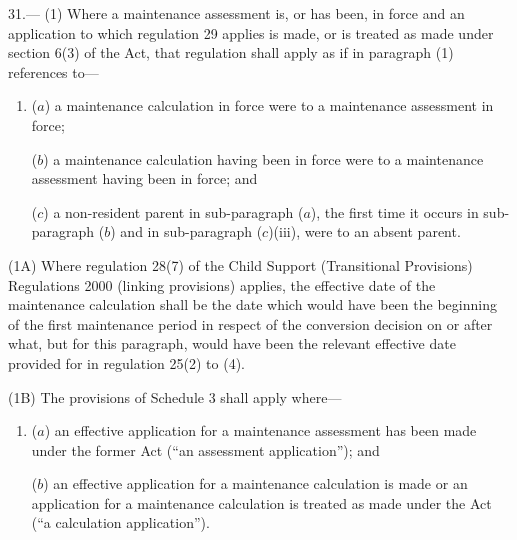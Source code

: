 \documentclass[12pt,a4paper]{article}
\begin{document}
31.---%
%
%
%
(1) Where a maintenance assessment is, or has been, in force and an application to which regulation 29 applies is made, or is treated as made under section 6(3) of the Act, that regulation shall apply as if in paragraph (1) references to—
\begin{enumerate}\item[]
($a$) a maintenance calculation in force were to a maintenance assessment in force;

($b$) a maintenance calculation having been in force were to a maintenance assessment having been in force; and

($c$) a non-resident parent in sub-paragraph ($a$), the first time it occurs in sub-paragraph ($b$)  and in sub-paragraph ($c$)(iii), were to an absent parent.
\end{enumerate}

(1A) Where regulation 28(7) of the Child Support (Transitional Provisions) Regulations 2000 (linking provisions) applies, the effective date of the maintenance calculation shall be the date which would have been the beginning of the first maintenance period in respect of the conversion decision on or after what, but for this paragraph, would have been the relevant effective date provided for in regulation 25(2) to (4).

(1B) The provisions of Schedule 3 shall apply where—
\begin{enumerate}\item[]
($a$) an effective application for a maintenance assessment has been made under the former Act (“an assessment application”); and

($b$) an effective application for a maintenance calculation is made or an application for a maintenance calculation is treated as made under the Act (“a calculation application”).
\end{enumerate}
\end{document}
